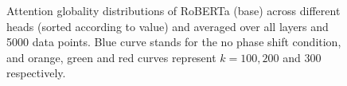 \documentclass[letterpaper, 12pt]{report}
\begin{document}
\begin{figure}
    \centering
    \caption{Attention globality distributions of RoBERTa (base) across different heads (sorted according to value) and averaged over all layers and 5000 data points. Blue curve stands for the no phase shift condition, and orange, green and red curves represent $k=100,200$ and $300$ respectively.}
    \label{fig:globality_roberta-base}
\end{figure}
\end{document}
